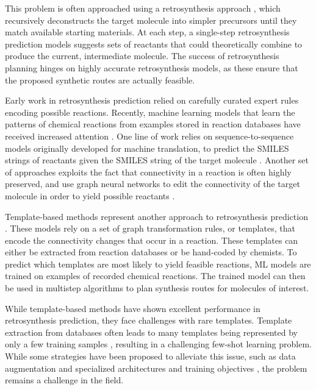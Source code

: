 This problem is often approached using a retrosynthesis approach
\citep{coreyLogicChemicalSynthesis1989}, which
recursively deconstructs the target molecule into simpler precursors until they match available
starting materials. At each step, a single-step retrosynthesis prediction models suggests sets of
reactants that could theoretically combine to produce the current, intermediate molecule.
The success of retrosynthesis planning hinges on highly accurate retrosynthesis models, as these
ensure that the proposed synthetic routes are actually feasible.

Early work in retrosynthesis prediction relied on carefully curated expert rules encoding possible
reactions. Recently, machine learning models that learn the patterns of chemical reactions from
examples stored in reaction databases have received increased attention
\citep{coleyMachineLearningComputerAided2018,strieth-kalthoffMachineLearningRopes2020}. One line of
work relies on sequence-to-sequence models originally developed for machine translation, to predict
the SMILES strings of reactants given the SMILES string of the target molecule
\citep{schwallerMolecularTransformerModel2019,namLinkingNeuralMachine2016,schwallerFoundTranslationPredicting2018,karpovTransformerModelRetrosynthesis2019,tetkoStateartAugmentedNLP2020}.
Another set of approaches exploits the fact that connectivity in a reaction is often highly
preserved, and use graph neural networks to edit the connectivity of the target molecule in order to
yield possible reactants
\citep{sachaMoleculeEditGraph2021,shiGraphGraphsFramework2020,somnathLearningGraphModels2021,yanRetroXpertDecomposeRetrosynthesis2020}.

Template-based methods represent another approach to retrosynthesis prediction
\citep{seglerNeuralSymbolicMachineLearning2017,seglerPlanningChemicalSyntheses2018,daiRetrosynthesisPredictionConditional2019,sunUnderstandingRetrosynthesisEnergybased2021}.
These models rely on a set of graph transformation rules, or templates, that encode the connectivity
changes that occur in a reaction. These templates can either be extracted from reaction databases or
be hand-coded by chemists. To predict which templates are most likely to yield feasible reactions,
\ac{ML} models are trained on examples of recorded chemical reactions. The trained model can then be
used in multistep algorithms to plan synthesis routes for molecules of interest.

While template-based methods have shown excellent performance in retrosynthesis prediction, they
face challenges with rare templates. Template extraction from databases often leads to many
templates being represented by only a few training samples
\citep{fortunatoDataAugmentationPretraining2020}, resulting in a challenging few-shot learning
problem. While some strategies have been proposed to alleviate this issue, such as data augmentation
\citep{fortunatoDataAugmentationPretraining2020} and specialized architectures and training
objectives \citep{daiRetrosynthesisPredictionConditional2019}, the problem remains a challenge in
the field.

